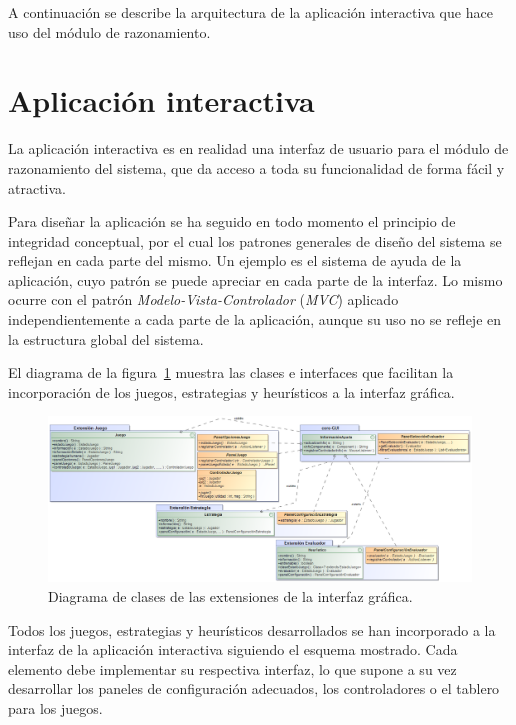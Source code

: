 \bigskip
A continuación se describe la arquitectura de la aplicación interactiva que hace uso del módulo de razonamiento.

\section{Aplicación interactiva}
\label{sec:arquitectura_aplicacion_interactiva}
La aplicación interactiva es en realidad una interfaz de usuario para el módulo de razonamiento del sistema, que da acceso a toda su funcionalidad de forma fácil y atractiva.

Para diseñar la aplicación se ha seguido en todo momento el principio de integridad conceptual, por el cual los patrones generales de diseño del sistema se reflejan en cada parte del mismo. Un ejemplo es el sistema de ayuda de la aplicación, cuyo patrón se puede apreciar en cada parte de la interfaz.
Lo mismo ocurre con el patrón \textit{Modelo-Vista-Controlador} (\textit{MVC}) aplicado independientemente a cada parte de la aplicación, aunque su uso no se refleje en la estructura global del sistema.

El diagrama de la figura~\ref{fig:diagramaclases_gui} muestra las clases e interfaces que facilitan la incorporación de los juegos, estrategias y heurísticos a la interfaz gráfica.

\begin{figure}[!p]
	\centering
	\includegraphics[scale=0.4,angle=90]{contenido/cap6/imagenes/diagramaclases_gui.eps}
	\caption{Diagrama de clases de las extensiones de la interfaz gráfica.}
	\label{fig:diagramaclases_gui}
\end{figure}

Todos los juegos, estrategias y heurísticos desarrollados se han incorporado a la interfaz de la aplicación interactiva siguiendo el esquema mostrado.
Cada elemento debe implementar su respectiva interfaz, lo que supone a su vez desarrollar los paneles de configuración adecuados, los controladores o el tablero para los juegos.

